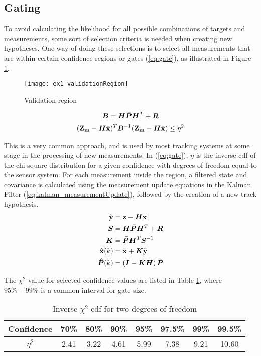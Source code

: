 \subsection{Gating}
To avoid calculating the likelihood for all possible combinations of targets and measurements, some sort of selection criteria is needed when creating new hypotheses. One way of doing these selections is to select all measurements that are within certain confidence regions or gates (\ref{eq:gate}), as illustrated in Figure \ref{fig:validation_region}.
\begin{figure}[H]
\centering
\texttt{[image: ex1-validationRegion]}
\caption{Validation region}
\label{fig:validation_region}
\end{figure}
\begin{equation}
\begin{gathered}
\bm{B}	= \bm{H} \bm{\bar{P}} \bm{H}^T + \bm{R} \\
(\boldsymbol{\mathbf{Z_m}} - \bm{H}\boldsymbol{\mathbf{\bar{x}}})^T	\bm{B}^{-1} (\boldsymbol{\mathbf{Z_m}} - \bm{H}\boldsymbol{\mathbf{\bar{x}}}) \leq \eta^2
\label{eq:gate}
\end{gathered}
\end{equation}

This is a very common approach, and is used by most tracking systems at some stage in the processing of new measurements. In (\ref{eq:gate}), $\eta$ is the inverse \gls{cdf} of the chi-square distribution for a given confidence with degrees of freedom equal to the sensor system. For each measurement inside the region, a filtered state and covariance is calculated using the measurement update equations in the Kalman Filter (\ref{eq:kalman_measurementUpdate}), followed by the creation of a new track hypothesis.
\begin{equation}
\begin{split}
\boldsymbol{\mathbf{\tilde{y}}}	&= \boldsymbol{\mathbf{z}} - \bm{H} \boldsymbol{\mathbf{\bar{x}}} \\
\bm{S}			&= \bm{H} \bm{\bar{P}} \bm{H}^T + \bm{R} \\
\bm{K} 			&= \bm{\bar{P}} \bm{H}^T \bm{S}^{-1} \\
\boldsymbol{\mathbf{\hat{x}}}(k) 	&= \boldsymbol{\mathbf{\bar{x}}} + \bm{K} \boldsymbol{\mathbf{\tilde{y}}} \\
\bm{\hat{P}}(k) 	&= \left( \bm{I} - \bm{K} \bm{H} \right) \bm{\bar{P}}
\end{split}
\label{eq:kalman_measurementUpdate}
\end{equation}

The $\chi^2$ value for selected confidence values are listed in Table \ref{tab:chi_square}, where $95\% - 99\%$ is a common interval for gate size. 
\begin{table}[H]
\centering
\begin{tabular}{c c c c c c c c}
Confidence 	& 70\% 	& 80\% 	& 90\% 	& 95\% 	& 97.5\% 	& 99\% 	& 99.5\% \\ \hline
$\eta^2$ 	& 2.41 	& 3.22 	& 4.61 	& 5.99 	& 7.38 		& 9.21 	& 10.60
\end{tabular}
\caption{Inverse $\chi^2$ \gls{cdf} for two degrees of freedom}
\label{tab:chi_square}
\end{table}


